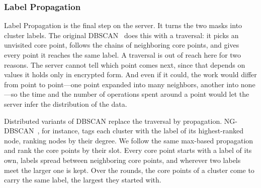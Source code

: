 
\subsubsection{Label Propagation}
\label{sec:lp}

Label Propagation is the final step on the server. It turns the two
masks into cluster labels. The original DBSCAN~\cite{ester1996density}
does this with a traversal: it picks an unvisited core point, follows the
chains of neighboring core points, and gives every point it reaches the
same label. A traversal is out of reach here for two reasons. The server
cannot tell which point comes next, since that depends on values it holds
only in encrypted form. And even if it could, the work would differ from
point to point---one point expanded into many neighbors, another into
none---so the time and the number of operations spent around a point
would let the server infer the distribution of the data.

Distributed variants of DBSCAN replace the traversal by propagation.
NG-DBSCAN~\cite{lulli2016ng}, for instance, tags each cluster with
the label of its highest-ranked node, ranking nodes by their degree. We
follow the same max-based propagation and rank the core points by their
slot. Every core point starts with a label of its own, labels spread
between neighboring core points, and wherever two labels meet the larger
one is kept. Over the rounds, the core points of a cluster come to carry
the same label, the largest they started with.

